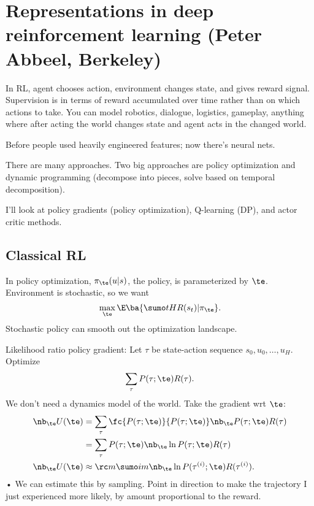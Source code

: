 \section{Representations in deep reinforcement learning (Peter Abbeel, Berkeley)}

In RL, agent chooses action, environment changes state, and gives reward signal. Supervision is in terms of reward accumulated over time rather than on which actions to take. You can model robotics, dialogue, logistics, gameplay, anything where after acting the world changes state and agent acts in the changed world.

Before people used heavily engineered features; now there's neural nets.

There are many approaches. Two big approaches are policy optimization and dynamic programming (decompose into pieces, solve based on temporal decomposition).

I'll look at policy gradients (policy optimization), Q-learning (DP), and actor critic methods.

\subsection{Classical RL}

In policy optimization, $\pi_\te(u|s)$, the policy, is parameterized by $\te$. Environment is stochastic, so we want
$$
\max_\te \E\ba{\sumo tH R(s_t)|\pi_\te}.
$$
Stochastic policy can smooth out the optimization landscape.

Likelihood ratio policy gradient: Let $\tau$ be state-action sequence $s_0,u_0,\ldots, u_H$. Optimize
$$
\sum_\tau P(\tau;\te)R(\tau).
$$
We don't need a dynamics model of the world.
Take the gradient wrt $\te$:
\begin{align}
\nb_\te U(\te) &= \sum_\tau \fc{P(\tau;\te)}{P(\tau;\te)}\nb_\te P(\tau;\te)R(\tau)\\
&=\sum_\tau P(\tau;\te) \nb_\te \ln P(\tau;\te)R(\tau)\\
\nb_\te U(\te) &\approx \rc m \sumo im \nb_\te \ln P(\tau^{(i)};\te) R(\tau^{(i)}).
\end{align}•
We can estimate this by sampling.
Point in direction to make the trajectory I just experienced more likely, by amount proportional to the reward.


